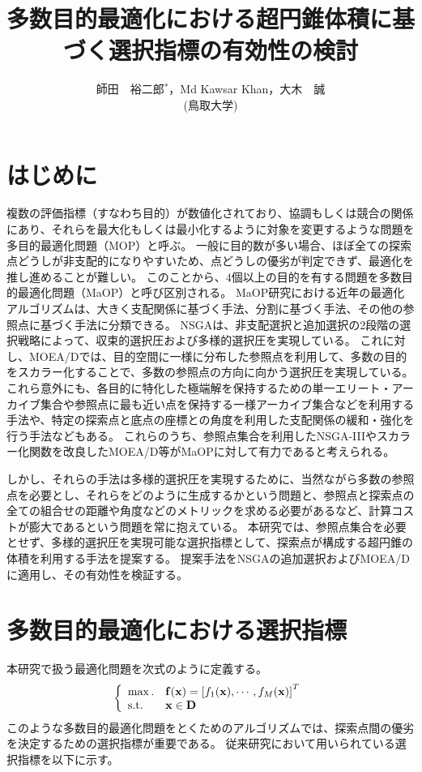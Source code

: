\documentclass{rentai-chugoku}
\title{
多数目的最適化における超円錐体積に基づく選択指標の有効性の検討
}
\author{
師田　裕二郎$^*$，Md Kawsar Khan，大木　誠\\
 (鳥取大学)
}
\begin{document}
\setlength{}
\maketitle
\section{はじめに}
複数の評価指標（すなわち目的）が数値化されており、協調もしくは競合の関係にあり、それらを最大化もしくは最小化するように対象を変更するような問題を多目的最適化問題（MOP）と呼ぶ。
一般に目的数が多い場合、ほぼ全ての探索点どうしが非支配的になりやすいため、点どうしの優劣が判定できず、最適化を推し進めることが難しい。
このことから、$4$個以上の目的を有する問題を多数目的最適化問題（MaOP）と呼び区別される。
MaOP研究における近年の最適化アルゴリズムは、大きく支配関係に基づく手法、分割に基づく手法、その他の参照点に基づく手法に分類できる。
NSGAは、非支配選択と追加選択の2段階の選択戦略によって、収束的選択圧および多様的選択圧を実現している。
これに対し、MOEA/Dでは、目的空間に一様に分布した参照点を利用して、多数の目的をスカラー化することで、多数の参照点の方向に向かう選択圧を実現している。
これら意外にも、各目的に特化した極端解を保持するための単一エリート・アーカイブ集合や参照点に最も近い点を保持する一様アーカイブ集合などを利用する手法や、特定の探索点と底点の座標との角度を利用した支配関係の緩和・強化を行う手法などもある。
これらのうち、参照点集合を利用したNSGA-IIIやスカラー化関数を改良したMOEA/D等がMaOPに対して有力であると考えられる。

しかし、それらの手法は多様的選択圧を実現するために、当然ながら多数の参照点を必要とし、それらをどのように生成するかという問題と、参照点と探索点の全ての組合せの距離や角度などのメトリックを求める必要があるなど、計算コストが膨大であるという問題を常に抱えている。
本研究では、参照点集合を必要とせず、多様的選択圧を実現可能な選択指標として、探索点が構成する超円錐の体積を利用する手法を提案する。
提案手法をNSGAの追加選択およびMOEA/Dに適用し、その有効性を検証する。



\section{多数目的最適化における選択指標}

本研究で扱う最適化問題を次式のように定義する。
\begin{equation}
\left\{
\begin{array}{ll}
\max.& {\bf f}({\bf x}) = \left[ f_1({\bf x}), \cdots, f_M({\bf x})  \right]^T
\\
{\rm s.t.}& {\bf x} \in {\bf D}
\end{array}
\right.
\end{equation}
このような多数目的最適化問題をとくためのアルゴリズムでは、探索点間の優劣を決定するための選択指標が重要である。
従来研究において用いられている選択指標を以下に示す。
\end{document}
